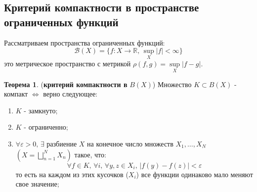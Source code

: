\documentclass[12pt]{article}
\newcommand{\MR}{\mathbb{R}}
\newcommand{\MB}{\mathcal{B}}
\newcommand{\VE}{\varepsilon}
\theoremstyle{definition}
\newtheorem{theorem}{Теорема}
\begin{document}
\subsection*{Критерий компактности в пространстве ограниченных функций}
Рассматриваем пространства ограниченных функций: 
$$
	\MB(X) = \{f \colon X \to \MR,\, \sup\limits_{X}|f| <  \infty \}
$$ 
это метрическое пространство с метрикой $\rho(f,g) = \sup\limits_{X}|f - g|$.
\begin{theorem}(\textbf{критерий компактности в} $B(X)$)
	Множество $K \subset B(X)$ - компакт $\Leftrightarrow$ верно следующее:
	\begin{enumerate}[label={\arabic*)}]
		\item $K$ - замкнуто;
		\item $K$ - ограниченно;
		\item $\forall \VE > 0, \, \exists$ разбиение $X$ на конечное число множеств $X_1, \dotsc, X_N$ $\left(X = \bigsqcup\limits_{n = 1}^N X_n \right)$ такое, что:
		$$
			\forall f \in K, \, \forall i, \, \forall y,z \in X_i, \, |f(y) - f(z)| < \VE
		$$
		то есть на каждом из этих кусочков ($X_i$) все функции одинаково мало меняют свое значение;
	\end{enumerate}
\end{theorem}
\end{document}
